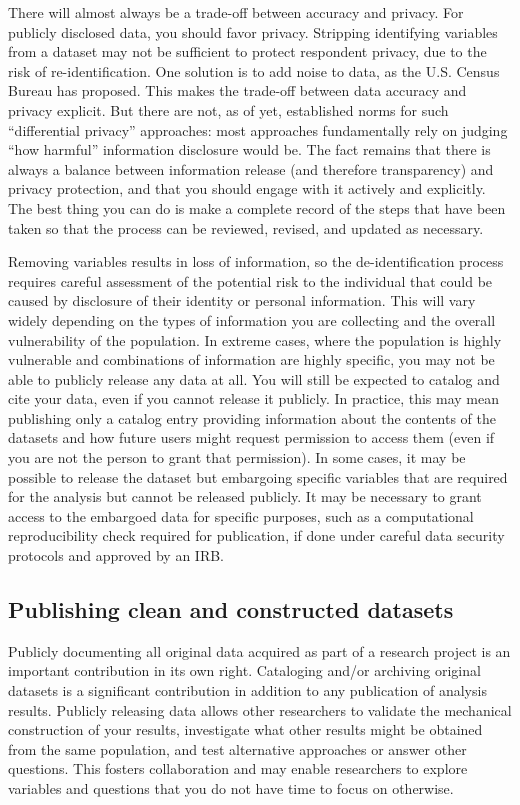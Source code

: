 There will almost always be a trade-off between accuracy and privacy.
For publicly disclosed data, you should favor privacy.
Stripping identifying variables from a dataset may not be sufficient to protect respondent privacy,
due to the risk of re-identification.
One solution is to add noise to data, as the U.S. Census Bureau has proposed.
This makes the trade-off between data accuracy and privacy explicit.
But there are not, as of yet, established norms for such ``differential privacy'' approaches:
most approaches fundamentally rely on judging ``how harmful'' information disclosure would be.
The fact remains that there is always a balance between information release (and therefore transparency)
and privacy protection, and that you should engage with it actively and explicitly.
The best thing you can do is make a complete record of the steps that have been taken
so that the process can be reviewed, revised, and updated as necessary.

Removing variables results in loss of information, so the de-identification process
requires careful assessment of the potential risk to the individual
that could be caused by disclosure of their identity or personal information.
This will vary widely depending on the types of information
you are collecting and the overall vulnerability of the population.
In extreme cases, where the population is highly vulnerable
and combinations of information are highly specific,
you may not be able to publicly release any data at all.
You will still be expected to catalog and cite your data,
even if you cannot release it publicly.
In practice, this may mean publishing only a catalog entry
providing information about the contents of the datasets
and how future users might request permission to access them
(even if you are not the person to grant that permission).
In some cases, it may be possible to release the dataset but
embargoing specific variables that are required for the analysis but cannot be released publicly.
It may be necessary to grant access to the embargoed data for specific purposes,
such as a computational reproducibility check required for publication,
if done under careful data security protocols and approved by an IRB.

\subsection{Publishing clean and constructed datasets}

Publicly documenting all original data acquired as part of a research project
is an important contribution in its own right.
Cataloging and/or archiving original datasets
is a significant contribution in addition to any publication of analysis results.
Publicly releasing data allows other researchers
to validate the mechanical construction of your results,
investigate what other results might be obtained from the same population,
and test alternative approaches or answer other questions.
This fosters collaboration and may enable researchers to explore variables and
questions that you do not have time to focus on otherwise.

